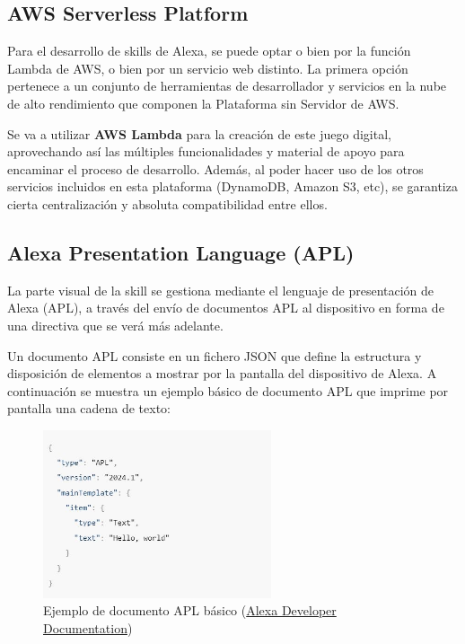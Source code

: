 \subsection{AWS Serverless Platform}

Para el desarrollo de skills de Alexa, se puede optar o bien por la función Lambda de AWS, o bien por un servicio web distinto. La primera opción pertenece a un conjunto de herramientas de desarrollador y servicios en la nube de alto rendimiento que componen la Plataforma sin Servidor de AWS.

Se va a utilizar \textbf{AWS Lambda} para la creación de este juego digital, aprovechando así las múltiples funcionalidades y material de apoyo para encaminar el proceso de desarrollo. Además, al poder hacer uso de los otros servicios incluidos en esta plataforma (DynamoDB, Amazon S3, etc), se garantiza cierta centralización y absoluta compatibilidad entre ellos.

\subsection{Alexa Presentation Language (APL)}

La parte visual de la skill se gestiona mediante el lenguaje de presentación de Alexa (APL), a través del envío de documentos APL al dispositivo en forma de una directiva que se verá más adelante.

Un documento APL consiste en un fichero JSON que define la estructura y disposición de elementos a mostrar por la pantalla del dispositivo de Alexa.
A continuación se muestra un ejemplo básico de documento APL que imprime por pantalla una cadena de texto:

\begin{figure}[H]
	\centering
	\includegraphics[width=0.6\textwidth]{imgs/apl-example.JPG}
	\caption{Ejemplo de documento APL básico (\href{https://developer.amazon.com/en-US/docs/alexa/alexa-presentation-language/apl-document.html}{Alexa Developer Documentation})}
	\label{fig:apl-ejemplo}
\end{figure}

